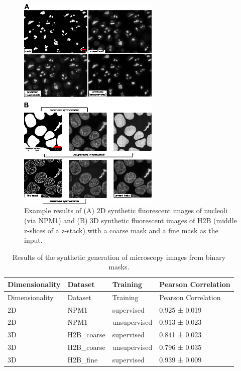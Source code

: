 \begin{figure}
\hypertarget{fig:synthetic}{%
\centering
\includegraphics[width=0.6\textwidth,height=\textheight]{images/synthetic_justin.png}
\caption{Example results of (A) 2D synthetic fluorescent images of nucleoli (via NPM1) and (B) 3D synthetic fluorescent images of H2B (middle z-slices of a z-stack) with a coarse mask and a fine mask as the input.}\label{fig:synthetic}
}
\end{figure}

\begin{longtable}[]{@{}llll@{}}
\caption{Results of the synthetic generation of microscopy images from binary masks. \label{tbl:syn}}\label{tbl:syn}\tabularnewline
\toprule()
Dimensionality & Dataset & Training & Pearson Correlation \\
\midrule()
\endfirsthead
\toprule()
Dimensionality & Dataset & Training & Pearson Correlation \\
\midrule()
\endhead
2D & NPM1 & supervised & 0.925 ± 0.019 \\
2D & NPM1 & unsupervised & 0.913 ± 0.023 \\
3D & H2B\_coarse & supervised & 0.841 ± 0.023 \\
3D & H2B\_coarse & unsupervised & 0.796 ± 0.035 \\
3D & H2B\_fine & supervised & 0.939 ± 0.009 \\
\bottomrule()
\end{longtable}

